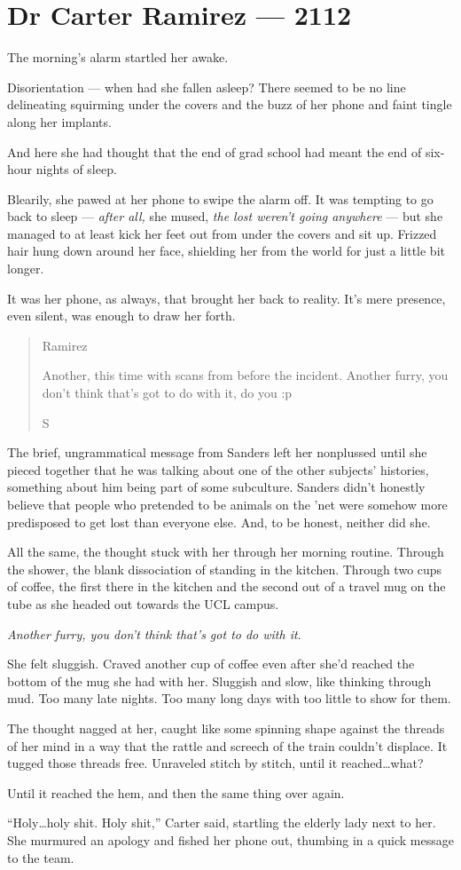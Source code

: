\hypertarget{dr-carter-ramirez-2112}{%
\chapter*{Dr Carter Ramirez — 2112}\label{dr-carter-ramirez-2112}}

The morning's alarm startled her awake.

Disorientation — when had she fallen asleep? There seemed to be no line delineating squirming under the covers and the buzz of her phone and faint tingle along her implants.

And here she had thought that the end of grad school had meant the end of six-hour nights of sleep.

Blearily, she pawed at her phone to swipe the alarm off. It was tempting to go back to sleep — \emph{after all,} she mused, \emph{the lost weren't going anywhere} — but she managed to at least kick her feet out from under the covers and sit up. Frizzed hair hung down around her face, shielding her from the world for just a little bit longer.

It was her phone, as always, that brought her back to reality. It's mere presence, even silent, was enough to draw her forth.

\begin{quote}
Ramirez

Another, this time with scans from before the incident. Another furry, you don't think that's got to do with it, do you :p

S
\end{quote}

The brief, ungrammatical message from Sanders left her nonplussed until she pieced together that he was talking about one of the other subjects' histories, something about him being part of some subculture. Sanders didn't honestly believe that people who pretended to be animals on the 'net were somehow more predisposed to get lost than everyone else. And, to be honest, neither did she.

All the same, the thought stuck with her through her morning routine. Through the shower, the blank dissociation of standing in the kitchen. Through two cups of coffee, the first there in the kitchen and the second out of a travel mug on the tube as she headed out towards the UCL campus.

\emph{Another furry, you don't think that's got to do with it}.

She felt sluggish. Craved another cup of coffee even after she'd reached the bottom of the mug she had with her. Sluggish and slow, like thinking through mud. Too many late nights. Too many long days with too little to show for them.

The thought nagged at her, caught like some spinning shape against the threads of her mind in a way that the rattle and screech of the train couldn't displace. It tugged those threads free. Unraveled stitch by stitch, until it reached\ldots{}what?

Until it reached the hem, and then the same thing over again.

``Holy\ldots{}holy shit. Holy shit,'' Carter said, startling the elderly lady next to her. She murmured an apology and fished her phone out, thumbing in a quick message to the team.
